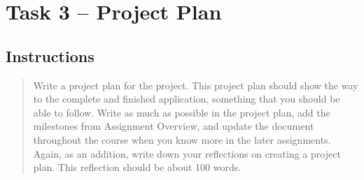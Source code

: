 \section{Task 3 -- Project Plan}\label{task-3-project-plan}

\subsection{Instructions}\label{instructions}

\begin{quote}
Write a project plan for the project. This project plan should show the
way to the complete and finished application, something that you should
be able to follow. Write as much as possible in the project plan, add
the milestones from Assignment Overview, and update the document
throughout the course when you know more in the later assignments.
Again, as an addition, write down your reflections on creating a project
plan. This reflection should be about 100 words.
\end{quote}
